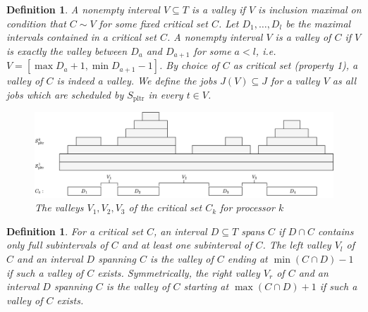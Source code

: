 \documentclass[a4paper]{article}
\DeclareMathOperator{\pltr}{pltr}
\DeclareMathOperator{\crit}{crit}
\newtheorem{definition}[theorem]{Definition}
\begin{document}
\begin{definition}
A nonempty interval $V \subseteq T$ is a \emph{valley} if $V$ is inclusion maximal on condition that $C \sim V$ for some fixed critical set $C$.
Let $D_1, \ldots, D_l$ be the maximal intervals contained in a critical set $C$.
A nonempty interval $V$ is a \emph{valley of $C$} if $V$ is exactly the valley between $D_{a}$ and $D_{a+1}$ for some $a < l$, i.e. $V = [\max D_a + 1, \min D_{a+1} - 1]$.
By choice of $C$ as critical set (property 1), a valley of $C$ is indeed a valley.
We define the jobs $J(V) \subseteq J$ for a valley $V$ as all jobs which are scheduled by $S_{\pltr}$ in every $t \in V$.
\begin{figure}[H]
  \centering
  \includegraphics[width=1\textwidth]{graphics/valleys_of.jpg}
  \caption{The valleys $V_1, V_2, V_3$ of the critical set $C_k$ for processor $k$}\label{fig:valleys_of}
\end{figure}
\end{definition}
\begin{definition}
  For a critical set $C$, an interval $D \subseteq T$ \emph{spans} $C$ if $D \cap C$ contains only full subintervals of $C$ and at least one subinterval of $C$.
  The \emph{left valley} $V_l$ of $C$ and an interval $D$ spanning $C$ is the valley of $C$ ending at $\min (C \cap D) - 1$ if such a valley of $C$ exists.
  Symmetrically, the \emph{right valley} $V_r$ of $C$ and an interval $D$ spanning $C$ is the valley of $C$ starting at $\max (C \cap D) + 1$ if such a valley of $C$ exists.
\end{definition}
\end{document}
